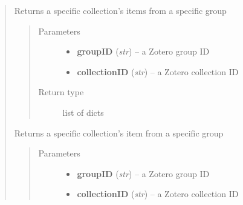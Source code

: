 \documentclass[letterpaper,10pt,english]{sphinxmanual}
\begin{document}
\begin{quote}
\begin{fulllineitems}
\begin{quote}
\begin{description}
\end{description}\end{quote}

\end{fulllineitems}



\begin{fulllineitems}
\label{index:pyzotero.zotero.Zotero.group_collection_items}
Returns a specific collection's items from a specific group
\begin{quote}\begin{description}
\item[{Parameters}] \leavevmode\begin{itemize}
\item {} 
\textbf{groupID} (\emph{str}) -- a Zotero group ID

\item {} 
\textbf{collectionID} (\emph{str}) -- a Zotero collection ID

\end{itemize}

\item[{Return type}] \leavevmode
list of dicts

\end{description}\end{quote}

\end{fulllineitems}



\begin{fulllineitems}
\label{index:pyzotero.zotero.Zotero.group_collection_item}
Returns a specific collection's item from a specific group
\begin{quote}\begin{description}
\item[{Parameters}] \leavevmode\begin{itemize}
\item {} 
\textbf{groupID} (\emph{str}) -- a Zotero group ID

\item {} 
\textbf{collectionID} (\emph{str}) -- a Zotero collection ID


\end{itemize}
\end{description}
\end{quote}
\end{fulllineitems}
\end{quote}
\end{document}
